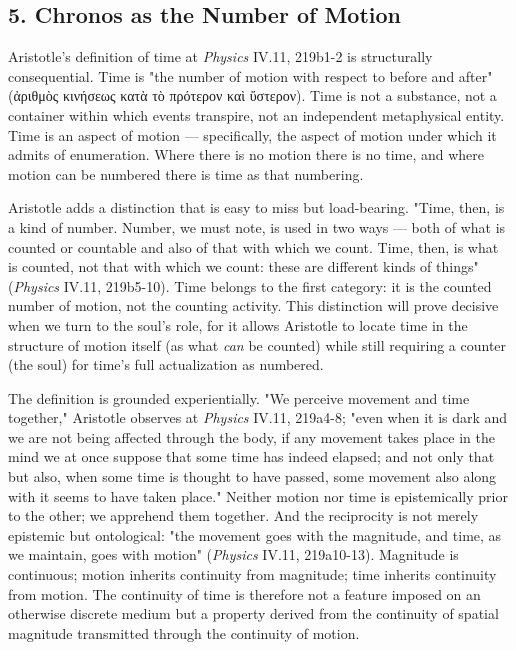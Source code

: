 \documentclass[12pt]{article}
\newcommand{\gk}[1]{{\greekfont #1}}%
\newcommand{\gk}[1]{{\greekfont #1}}%
\newcommand{\gk}[1]{#1}%
\begin{document}
\subsection*{5. Chronos as the Number of Motion}

Aristotle's definition of time at \textit{Physics} IV.11, 219b1-2 is structurally consequential. Time is "the number of motion with respect to before and after" (\gk{ἀριθμὸς κινήσεως κατὰ τὸ πρότερον καὶ ὕστερον}). Time is not a substance, not a container within which events transpire, not an independent metaphysical entity. Time is an aspect of motion --- specifically, the aspect of motion under which it admits of enumeration. Where there is no motion there is no time, and where motion can be numbered there is time as that numbering.

Aristotle adds a distinction that is easy to miss but load-bearing. "Time, then, is a kind of number. Number, we must note, is used in two ways --- both of what is counted or countable and also of that with which we count. Time, then, is what is counted, not that with which we count: these are different kinds of things" (\textit{Physics} IV.11, 219b5-10). Time belongs to the first category: it is the counted number of motion, not the counting activity. This distinction will prove decisive when we turn to the soul's role, for it allows Aristotle to locate time in the structure of motion itself (as what \textit{can} be counted) while still requiring a counter (the soul) for time's full actualization as numbered.

The definition is grounded experientially. "We perceive movement and time together," Aristotle observes at \textit{Physics} IV.11, 219a4-8; "even when it is dark and we are not being affected through the body, if any movement takes place in the mind we at once suppose that some time has indeed elapsed; and not only that but also, when some time is thought to have passed, some movement also along with it seems to have taken place." Neither motion nor time is epistemically prior to the other; we apprehend them together. And the reciprocity is not merely epistemic but ontological: "the movement goes with the magnitude, and time, as we maintain, goes with motion" (\textit{Physics} IV.11, 219a10-13). Magnitude is continuous; motion inherits continuity from magnitude; time inherits continuity from motion. The continuity of time is therefore not a feature imposed on an otherwise discrete medium but a property derived from the continuity of spatial magnitude transmitted through the continuity of motion.
\end{document}
